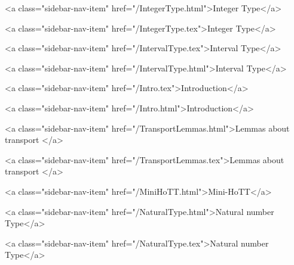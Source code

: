       
        
          <a class="sidebar-nav-item" href="/IntegerType.html">Integer Type</a>
        
      
    
      
        
          <a class="sidebar-nav-item" href="/IntegerType.tex">Integer Type</a>
        
      
    
      
        
          <a class="sidebar-nav-item" href="/IntervalType.tex">Interval Type</a>
        
      
    
      
        
          <a class="sidebar-nav-item" href="/IntervalType.html">Interval Type</a>
        
      
    
      
        
          <a class="sidebar-nav-item" href="/Intro.tex">Introduction</a>
        
      
    
      
        
          <a class="sidebar-nav-item" href="/Intro.html">Introduction</a>
        
      
    
      
        
          <a class="sidebar-nav-item" href="/TransportLemmas.html">Lemmas about transport </a>
        
      
    
      
        
          <a class="sidebar-nav-item" href="/TransportLemmas.tex">Lemmas about transport </a>
        
      
    
      
        
          <a class="sidebar-nav-item" href="/MiniHoTT.html">Mini-HoTT</a>
        
      
    
      
        
          <a class="sidebar-nav-item" href="/NaturalType.html">Natural number Type</a>
        
      
    
      
        
          <a class="sidebar-nav-item" href="/NaturalType.tex">Natural number Type</a>
        
      
    
